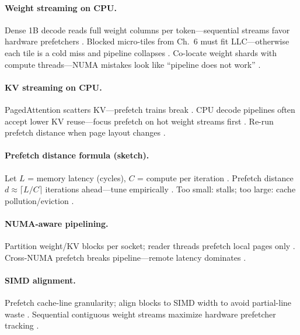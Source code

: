 \paragraph{Weight streaming on CPU.}
Dense 1B decode reads full weight columns per token---sequential streams favor hardware prefetchers \citep{kwon2023vllm,patel2025llminference,dlbook}.
Blocked micro-tiles from Ch.~6 must fit LLC---otherwise each tile is a cold miss and pipeline collapses \citep{yirage2026,dao2022flashattention,memoryfloor2026}.
Co-locate weight shards with compute threads---NUMA mistakes look like ``pipeline does not work'' \citep{taxbreak2026,chen2020compilerbasedhardw}.

\paragraph{KV streaming on CPU.}
PagedAttention scatters KV---prefetch trains break \citep{kwon2023vllm,dao2023flashdecoding,patel2025llminference}.
CPU decode pipelines often accept lower KV reuse---focus prefetch on hot weight streams first \citep{yirage2026,memoryfloor2026}.
Re-run prefetch distance when page layout changes \citep{chen2020compilerbasedhardw,taxbreak2026}.

\paragraph{Prefetch distance formula (sketch).}
Let $L$ = memory latency (cycles), $C$ = compute per iteration \citep{dlbook,memoryfloor2026}.
Prefetch distance $d \approx \lceil L / C \rceil$ iterations ahead---tune empirically \citep{patel2025llminference,yirage2026}.
Too small: stalls; too large: cache pollution/eviction \citep{dlbook,taxbreak2026}.

\paragraph{NUMA-aware pipelining.}
Partition weight/KV blocks per socket; reader threads prefetch local pages only \citep{patel2025llminference,kwon2023vllm,memoryfloor2026}.
Cross-NUMA prefetch breaks pipeline---remote latency dominates \citep{taxbreak2026,chen2020compilerbasedhardw}.

\paragraph{SIMD alignment.}
Prefetch cache-line granularity; align blocks to SIMD width to avoid partial-line waste \citep{dlbook,patel2025llminference}.
Sequential contiguous weight streams maximize hardware prefetcher tracking \citep{kwon2023vllm,yirage2026}.


